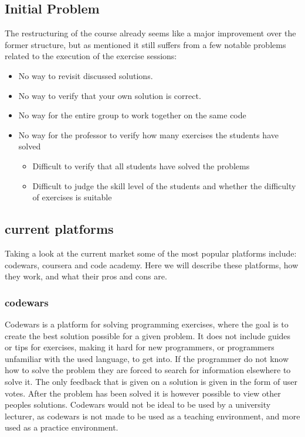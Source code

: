 \subsection{Initial Problem} \label{sec:initial-problem}
The restructuring of the course already seems like a major improvement over the former structure, but as mentioned it still suffers from a few notable problems related to the execution of the exercise sessions:
\begin{itemize}
	\item No way to revisit discussed solutions.
	\item No way to verify that your own solution is correct.
	\item No way for the entire group to work together on the same code
	\item No way for the professor to verify how many exercises the students have solved
	\begin{itemize}
		\item Difficult to verify that all students have solved the problems
		\item Difficult to judge the skill level of the students and whether the difficulty of exercises is suitable
	\end{itemize}
\end{itemize}

\subsection{current platforms}
Taking a look at the current market some of the most popular platforms include: codewars, coursera and code academy.
Here we will describe these platforms, how they work, and what their pros and cons are.

\subsubsection*{codewars}
Codewars is a platform for solving programming exercises, where the goal is to create the best solution possible for a given problem. It does not include guides or tips for exercises, making it hard for new programmers, or programmers unfamiliar with the used language, to get into. If the programmer do not know how to solve the problem they are forced to search for information elsewhere to solve it. The only feedback that is given on a solution is given in the form of user votes. After the problem has been solved it is however possible to view other peoples solutions. 
Codewars would not be ideal to be used by a university lecturer, as codewars is not made to be used as a teaching environment, and more used as a practice environment.

